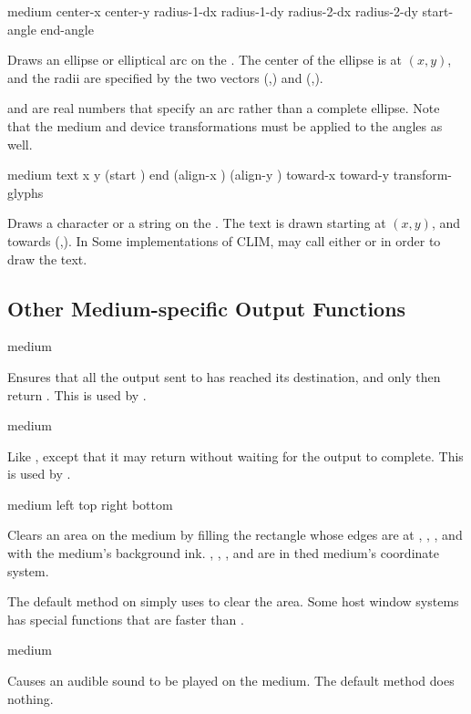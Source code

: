  {medium center-x center-y 
                                    radius-1-dx radius-1-dy radius-2-dx radius-2-dy  
                                    start-angle end-angle}


Draws an ellipse or elliptical arc on the  .  The
center of the ellipse is at $(x,y)$, and the radii are specified by the two
vectors (,) and
(,).

 and  are real numbers that specify an arc
rather than a complete ellipse.  Note that the medium and device transformations
must be applied to the angles as well.

 {medium text x y
                                 (start ) end
                                 (align-x ) (align-y )
                                 toward-x toward-y transform-glyphs}

Draws a character or a string on the  .  The text is
drawn starting at $(x,y)$, and towards (,).  In Some
implementations of CLIM,  may call either
 or  in order to draw the
text.

\subsection {Other Medium-specific Output Functions}

 {medium}

Ensures that all the output sent to  has reached its destination,
and only then return .  This is used by .

 {medium}

Like , except that it may return  without
waiting for the output to complete.  This is used by .

 {medium left top right bottom}

Clears an area on the {medium}  by filling the rectangle whose edges
are at , , , and  with the medium's
background ink.  , , , and  are in
thed medium's coordinate system.

The default method on  simply uses  to
clear the area.  Some host window systems has special functions that are faster
than .

 {medium}

Causes an audible sound to be played on the medium.  The default method
does nothing.


